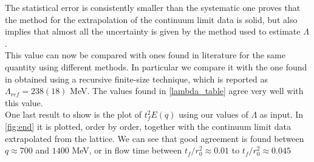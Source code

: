 The statistical error is consistently smaller than the systematic one proves that the method for the extrapolation of the continuum limit data is solid, but also implies that almost all the uncertainty is given by the method used to estimate $\Lambda$. \\
This value can now be compared with ones found in literature for the same quantity using different methods. In particular we compare it with the one found in \cite{capitani_non-perturbative_1999} obtained using a recursive finite-size technique, which is reported as $\Lambda_{ref} = 238(18)$ MeV. The values found in \cref{lambda_table} agree very well with this value.\\ 
One last result to show is the plot of $t_f^2E(q)$ using our values of $\Lambda$ as input. In \cref{fig:end} it is plotted, order by order, together with the continuum limit data extrapolated from the lattice. We can see that good agreement is found between $q \approx 700$ and $1400$ MeV, or in flow time between $t_f/r_0^2 \approx 0.01$ to $t_f/r_0^2 \approx 0.045$

